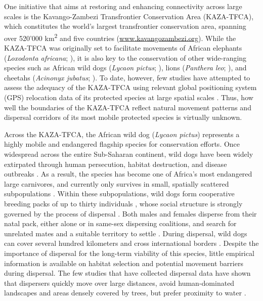 \documentclass[abstract=on,10pt,a4paper,bibliography=totocnumbered]{article}
\begin{document}
One initiative that aims at restoring and enhancing connectivity across large
scales is the Kavango-Zambezi Transfrontier Conservation Area (KAZA-TFCA), which
constitutes the world's largest transfrontier conservation area, spanning over
520'000 km\textsuperscript{2} and five countries (\url{www.kavangozambezi.org}).
While the KAZA-TFCA was originally set to facilitate movements of African
elephants (\textit{Loxodonta africana}; \citealp{Tshipa.2017}), it is also key
to the conservation of other wide-ranging species such as African wild dogs
(\textit{Lycaon pictus}; \citealp{Woodroffe.2012, Cozzi.2020}), lions
(\textit{Panthera leo}; \citealp{Elliot.2014, Cushman.2018}), and cheetahs
(\textit{Acinonyx jubatus}; \citealp{Weise.2017}). To date, however, few studies
have attempted to assess the adequacy of the KAZA-TFCA using relevant global
positioning system (GPS) relocation data of its protected species at large
spatial scales \citep{Elliot.2014, Tshipa.2017}. Thus, how
well the boundaries of the KAZA-TFCA reflect natural movement patterns and
dispersal corridors of its most mobile protected species is virtually unknown.

Across the KAZA-TFCA, the African wild dog (\textit{Lycaon pictus}) represents a
highly mobile and endangered flagship species for conservation efforts. Once
widespread across the entire Sub-Saharan continent, wild dogs have been widely
extirpated through human persecution, habitat destruction, and disease outbreaks
\citep{Woodroffe.2012}. As a result, the species has become one of Africa's most
endangered large carnivores, and currently only survives in small, spatially
scattered subpopulations \citep{Woodroffe.2012}. Within these subpopulations,
wild dogs form cooperative breeding packs of up to thirty individuals
\citep{Creel.2002}, whose social structure is strongly governed by the process
of dispersal \citep{McNutt.1996, Behr.2020}. Both males and females disperse
from their natal pack, either alone or in same-sex dispersing coalitions, and
search for unrelated mates and a suitable territory to settle
\citep{McNutt.1996, Cozzi.2020, Behr.2020}. During dispersal, wild dogs can
cover several hundred kilometers and cross international borders
\citep{Masenga.2016, Woodroffe.2019, Cozzi.2020}. Despite the importance of
dispersal for the long-term viability of this species, little empirical
information is available on habitat selection and potential movement barriers
during dispersal. The few studies that have collected dispersal data have shown
that dispersers quickly move over large distances, avoid human-dominated
landscapes and areas densely covered by trees, but prefer proximity to water
\citep{Masenga.2016, Woodroffe.2019, Oneill.2020, Cozzi.2020}.
\end{document}
